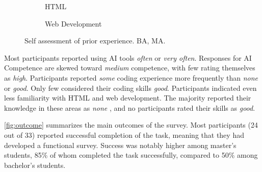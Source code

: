 \documentclass[english,anonymous]{lni}
\begin{document}
\begin{figure}
\begin{subfigure}{0.2\textwidth}
\begin{tikzpicture}
  \end{tikzpicture}
  \caption{HTML}
\end{subfigure}\hfill \begin{subfigure}{0.2\textwidth} \scriptsize
  \centering
  \caption{Web Development}
\end{subfigure}
\caption{Self assessment of prior experience. 
\protect{} BA, 
\protect{} MA.}\label{fig:prior}
\end{figure}

Most participants reported using AI tools \emph{often} or \emph{very often}. Responses for AI Competence are skewed toward \emph{medium} competence, with few rating themselves as \emph{high}. 
 Participants reported \emph{some} coding experience more frequently than \emph{none} or \emph{good}. Only few considered their coding skills \emph{good}. 
Participants indicated even less familiarity with HTML and web development. The majority reported their  knowledge in these areas as \emph{none} , and no participants rated their skills as \emph{good}.

\cref{fig:outcome} summarizes the main outcomes of the survey. 
Most participants (24 out of 33) reported successful completion of the task, meaning that they had developed a functional survey. Success was notably higher among master's students, 85\% of whom completed the task successfully, compared to 50\% among bachelor’s students.
\end{document}
